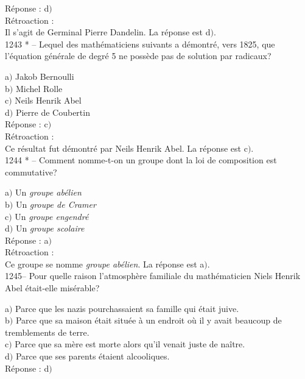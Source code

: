 ﻿\documentclass[letterpaper, 12pt]{article}
\begin{document}
R\'eponse : d$)$\\

R\'etroaction : \\
Il s'agit de Germinal Pierre Dandelin.
La r\'eponse est d$)$.\\

1243 * -- Lequel des math\'ematiciens suivants a d\'emontr\'e, vers
1825, que l'\'equation g\'en\'erale de degr\'e 5 ne poss\`ede pas de
solution par radicaux?

a$)$ Jakob Bernoulli  \\
b$)$ Michel Rolle \\
c$)$ Neils Henrik Abel \\
d$)$ Pierre de Coubertin\\

R\'eponse : c$)$\\

R\'etroaction : \\
Ce r\'esultat fut d\'emontr\'e par Neils Henrik Abel.
La r\'eponse est c$)$.\\

1244 * -- Comment nomme-t-on un groupe dont la loi de composition
est commutative?

a$)$ Un {\sl groupe ab\'elien}  \\
b$)$ Un {\sl groupe de Cramer} \\
c$)$ Un {\sl groupe engendr\'e} \\
d$)$ Un {\sl groupe scolaire}\\

R\'eponse : a$)$\\

R\'etroaction : \\
Ce groupe se nomme {\sl groupe ab\'elien}.
La r\'eponse est a$)$.\\

1245-- Pour quelle raison l'atmosph\`ere familiale du
math\'ematicien Niels Henrik Abel \'etait-elle mis\'erable?

a$)$ Parce que les nazis pourchassaient sa famille qui \'etait juive. \\
b$)$ Parce que sa maison \'etait situ\'ee \`a un endroit o\`u il y avait
beaucoup de tremblements de terre. \\
c$)$ Parce que sa m\`ere est morte alors qu'il venait juste de na\^itre. \\
d$)$ Parce que ses parents \'etaient alcooliques.  \\

R\'eponse : d$)$\\
\end{document}
